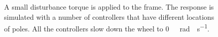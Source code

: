 \begin{figure}[H]
\begin{minipage}{\linewidth}
{		}
		\caption{A small disturbance torque is applied to the frame. The response is simulated with a number of controllers that have different locations of poles. All the controllers slow down the wheel to \si{0\ rad \cdot s^{-1}}.}
		\label{disturbanceStateSpaceFrameAndWheel}
	\end{minipage}
\end{figure}
%
